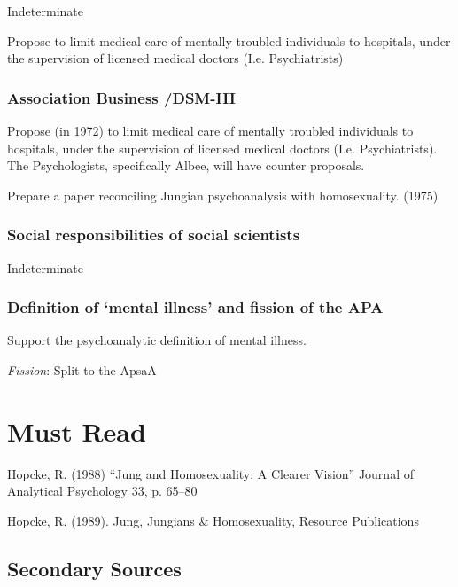 \begin{refsection}
Indeterminate
\begin{proposal}[Hopcke]\label{proposal:hopcke}
Propose to limit medical care of mentally troubled individuals to hospitals, under the supervision of licensed medical doctors (I.e. Psychiatrists)
\end{proposal}

\subsubsection{Association Business \slash  DSM-III}
\label{associationbusinessdsm-iii}

Propose (in 1972) to limit medical care of mentally troubled individuals to hospitals, under the supervision of licensed medical doctors (I.e. Psychiatrists). The Psychologists, specifically Albee, will have counter proposals.
\begin{writingtask}[Hopcke]\label{writingtask:hopcke}
Prepare a paper reconciling Jungian psychoanalysis with homosexuality. (1975)
\end{writingtask}

\subsubsection{Social responsibilities of social scientists}
\label{socialresponsibilitiesofsocialscientists}

Indeterminate

\subsubsection{Definition of ‘mental illness’ and fission of the APA}
\label{definitionof‘mentalillness’andfissionoftheapa}

Support the psychoanalytic definition of mental illness.

\emph{Fission}: Split to the ApsaA

\section{Must Read}
\label{mustread}

Hopcke, R. (1988) “Jung and Homosexuality: A Clearer Vision” Journal of Analytical Psychology 33, p. 65--80

Hopcke, R. (1989). Jung, Jungians \& Homosexuality, Resource Publications

\subsection{Secondary Sources}
\label{secondarysources}


\end{refsection}
